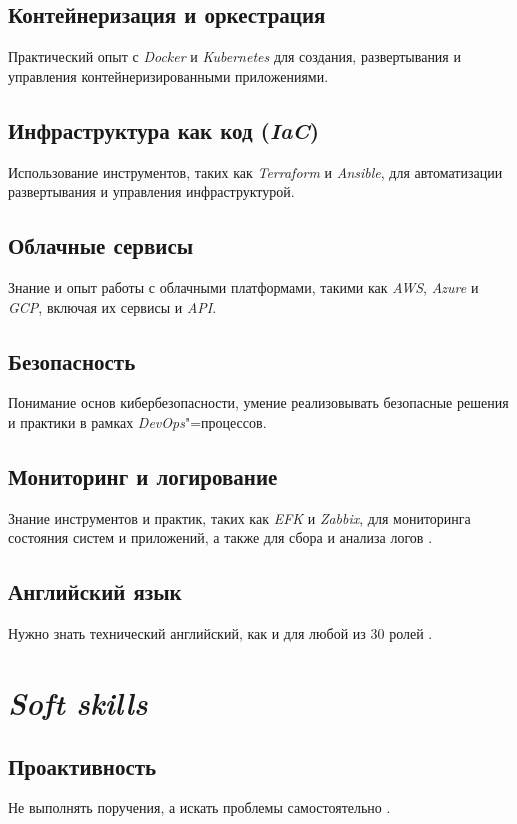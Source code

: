 \documentclass[variant=practice]{bsuir}
\begin{document}
\subsection{Контейнеризация и оркестрация} Практический опыт с \textit{Docker} и
\textit{Kubernetes} для создания, развертывания и управления
контейнеризированными приложениями.

\subsection{Инфраструктура как код (\textit{IaC})} Использование инструментов,
таких как \textit{Terraform} и \textit{Ansible}, для автоматизации развертывания
и управления инфраструктурой.

\subsection{Облачные сервисы} Знание и опыт работы с облачными платформами,
такими как \textit{AWS}, \textit{Azure} и \textit{GCP}, включая их сервисы и
\textit{API}.

\subsection{Безопасность} Понимание основ кибербезопасности, умение
реализовывать безопасные решения и практики в рамках \textit{DevOps}"=процессов.

\subsection{Мониторинг и логирование} Знание инструментов и практик, таких как
\textit{EFK} и \textit{Zabbix}, для мониторинга состояния систем и приложений, а
также для сбора и анализа логов \cite{devops-mts}.

\subsection{Английский язык} Нужно знать технический английский, как и для любой
из 30 ролей \cite{devops-mts}.

\section{\textit{Soft skills}}

\subsection{Проактивность} Не выполнять поручения, а искать проблемы
самостоятельно \cite{devops-mts}.
\end{document}
